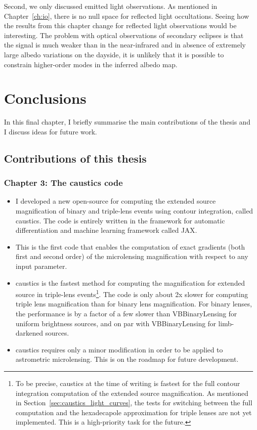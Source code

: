\documentclass[12pt,dvipsnames]{report}
\newcommand{\ssf}[1]{\textsf{#1}}
\begin{document}
Second, we only discussed emitted light observations. As mentioned in 
Chapter~\ref{ch:io}, there is no null space for reflected light occultations. Seeing how 
the results from this chapter change for reflected light observations would be 
interesting. The problem with optical observations of secondary eclipses is that the signal is much 
weaker than in the near-infrared and in absence of extremely large albedo variations on the dayside,
it is unlikely that it is possible to constrain higher-order modes in the inferred albedo map.

\chapter{Conclusions}
\label{ch:conclusions}
In this final chapter, I briefly summarise the main contributions of the thesis and I discuss 
ideas for future work.

\section{Contributions of this thesis}
\subsection{Chapter 3: The \ssf{caustics} code}
\begin{itemize}
\item I developed a new open-source for computing the extended source magnification 
of binary and triple-lens events using contour integration, called \ssf{caustics}. 
The code is entirely written in the framework for automatic differentiation
and machine learning framework called \ssf{JAX}.
\item This is the first code that enables the computation of \ssf{exact gradients} (both 
first and second order) of the microlensing magnification with respect to any input parameter. 
\item \ssf{caustics} is the fastest method for computing the magnification for extended source 
in triple-lens events\footnote{To be precise, \ssf{caustics} at the time of writing is fastest
for the full contour integration computation of the extended source magnification. As mentioned 
in Section~\ref{sec:caustics_light_curves}, the tests for switching between the full computation
and the hexadecapole approximation for triple lenses are not yet implemented. This is a high-priority
task for the future.}.
The code is only about 2x slower for computing triple lens magnification than 
for binary lens magnification. For binary lenses, the performance is by a factor of a few slower than 
\ssf{VBBinaryLensing} for uniform brightness sources, and on par with \ssf{VBBinaryLensing}
for limb-darkened sources.
\item  \ssf{caustics} requires only a minor modification in order to be applied to
astrometric microlensing. This is on the roadmap for future development.
\end{itemize}
\end{document}
